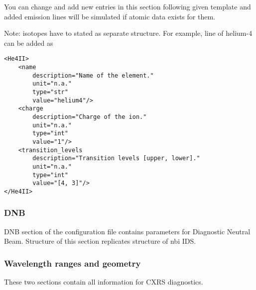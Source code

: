 \documentclass[../main.tex]{subfiles}
\begin{document}
You can change and add new entries in this section following given template and added emission lines will be simulated if atomic data exists for them.

Note: isotopes have to stated as separate structure. For example, line of helium-4 can be added as

\begin{verbatim}
<He4II>
    <name
        description="Name of the element."
        unit="n.a."
        type="str"
        value="helium4"/>
    <charge
        description="Charge of the ion."
        unit="n.a."
        type="int"
        value="1"/>
    <transition_levels
        description="Transition levels [upper, lower]."
        unit="n.a."
        type="int"
        value="[4, 3]"/>
</He4II>
\end{verbatim}


\subsubsection{DNB}

DNB section of the configuration file contains parameters for Diagnostic Neutral Beam. Structure of this section replicates structure of nbi IDS.

\subsubsection{Wavelength ranges and geometry}

These two sections contain all information for CXRS diagnostics.
\end{document}

